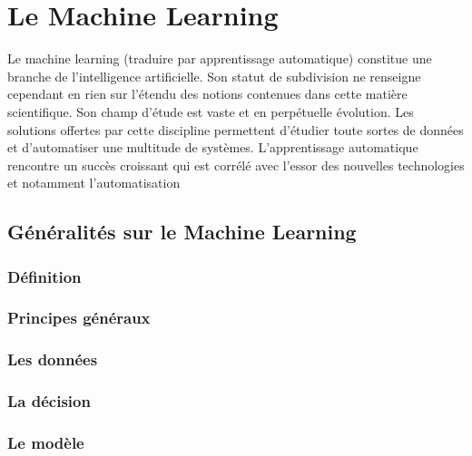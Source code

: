 \chapter{ Le  Machine Learning}
\label{Le Machine Learning}
\thispagestyle{fancy}
Le machine learning (traduire par apprentissage automatique) constitue une branche de l'intelligence artificielle. Son statut de subdivision ne renseigne cependant en rien sur l'étendu des notions contenues dans cette matière scientifique. Son champ d'étude est vaste et en perpétuelle évolution. Les solutions offertes par cette discipline permettent d'étudier toute sortes de données et d'automatiser une multitude de systèmes. L'apprentissage automatique rencontre un succès croissant qui est corrélé avec l'essor des nouvelles technologies et notamment l'automatisation 

\section{Généralités sur le Machine Learning}
\label{Le Machine Learning: Généralités sur le Machine Learning}

\subsection{Définition}
\label{Le Machine Learning: Les différents algorithmes: Définition}

\subsection{Principes généraux}
\label{Le Machine Learning: Les différents algorithmes: Principes généraux}

\subsection{Les données}
\label{Le Machine Learning: Les différents algorithmes: Les données}

\subsection{La décision}
\label{Le Machine Learning: Les différents algorithmes: La décision}

\subsection{Le modèle}
\label{Le Machine Learning: Les différents algorithmes: Le modèle}



